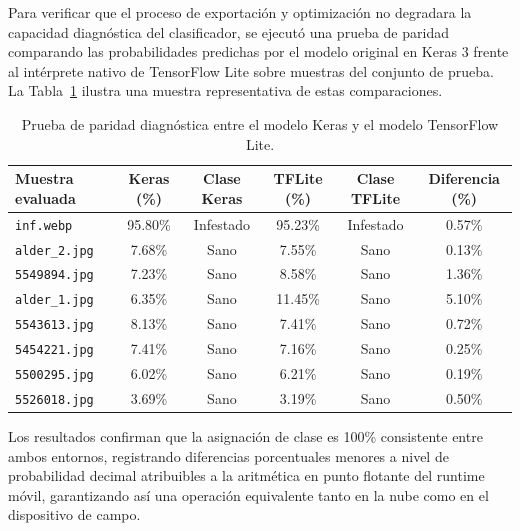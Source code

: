 Para verificar que el proceso de exportación y optimización no degradara la capacidad diagnóstica del clasificador, se ejecutó una prueba de paridad comparando las probabilidades predichas por el modelo original en Keras 3 frente al intérprete nativo de TensorFlow Lite sobre muestras del conjunto de prueba. La Tabla~\ref{tab:paridad_tflite} ilustra una muestra representativa de estas comparaciones.

\begin{table}[H]
\centering
\small
\setlength{\tabcolsep}{4.5pt}
\caption{Prueba de paridad diagnóstica entre el modelo Keras y el modelo TensorFlow Lite.}
\label{tab:paridad_tflite}
\renewcommand{\arraystretch}{1.2}
\begin{tabular}{|l|c|c|c|c|c|}
\hline
\textbf{Muestra evaluada} & \textbf{Keras (\%)} & \textbf{Clase Keras} & \textbf{TFLite (\%)} & \textbf{Clase TFLite} & \textbf{Diferencia (\%)} \\
\hline
\texttt{inf.webp} & 95.80\% & Infestado & 95.23\% & Infestado & 0.57\% \\
\hline
\texttt{alder\_2.jpg} & 7.68\% & Sano & 7.55\% & Sano & 0.13\% \\
\hline
\texttt{5549894.jpg} & 7.23\% & Sano & 8.58\% & Sano & 1.36\% \\
\hline
\texttt{alder\_1.jpg} & 6.35\% & Sano & 11.45\% & Sano & 5.10\% \\
\hline
\texttt{5543613.jpg} & 8.13\% & Sano & 7.41\% & Sano & 0.72\% \\
\hline
\texttt{5454221.jpg} & 7.41\% & Sano & 7.16\% & Sano & 0.25\% \\
\hline
\texttt{5500295.jpg} & 6.02\% & Sano & 6.21\% & Sano & 0.19\% \\
\hline
\texttt{5526018.jpg} & 3.69\% & Sano & 3.19\% & Sano & 0.50\% \\
\hline
\end{tabular}
\end{table}

Los resultados confirman que la asignación de clase es 100\% consistente entre ambos entornos, registrando diferencias porcentuales menores a nivel de probabilidad decimal atribuibles a la aritmética en punto flotante del runtime móvil, garantizando así una operación equivalente tanto en la nube como en el dispositivo de campo.
